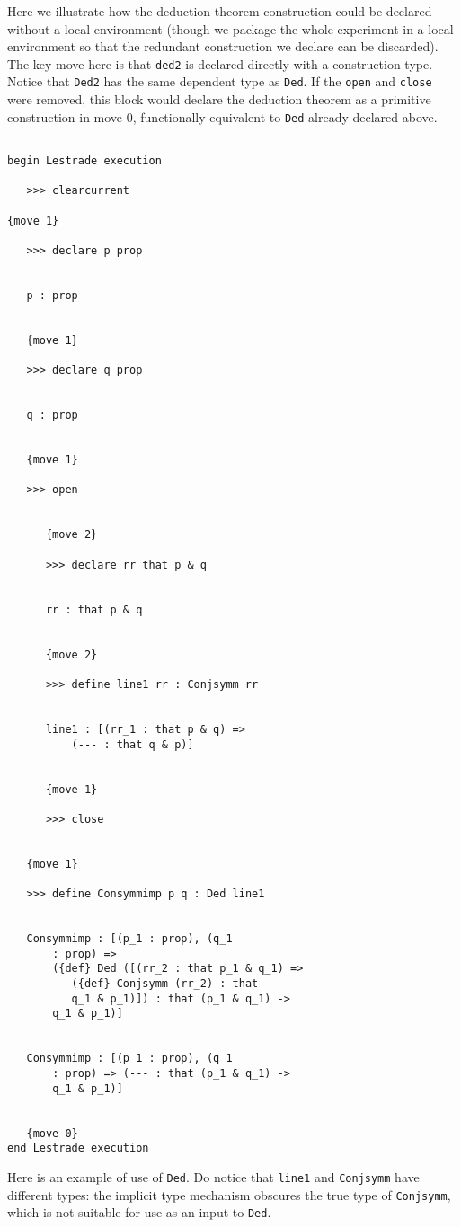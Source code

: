\documentclass[12pt]{article}
\begin{document}
Here we illustrate how the deduction theorem construction could be declared without a local environment (though we package the whole experiment in a local environment so that the redundant  construction we declare can be discarded).  The key move here is that {\tt ded2} is declared directly with a construction type.   Notice that {\tt Ded2} has the same dependent type as {\tt Ded}.  If the {\tt open} and {\tt close} were removed, this block would declare the deduction theorem as a primitive construction in move 0, functionally equivalent to {\tt Ded} already declared above.

\begin{verbatim}

begin Lestrade execution

   >>> clearcurrent

{move 1}

   >>> declare p prop


   p : prop


   {move 1}

   >>> declare q prop


   q : prop


   {move 1}

   >>> open


      {move 2}

      >>> declare rr that p & q


      rr : that p & q


      {move 2}

      >>> define line1 rr : Conjsymm rr


      line1 : [(rr_1 : that p & q) => 
          (--- : that q & p)]


      {move 1}

      >>> close


   {move 1}

   >>> define Consymmimp p q : Ded line1


   Consymmimp : [(p_1 : prop), (q_1 
       : prop) => 
       ({def} Ded ([(rr_2 : that p_1 & q_1) => 
          ({def} Conjsymm (rr_2) : that 
          q_1 & p_1)]) : that (p_1 & q_1) -> 
       q_1 & p_1)]


   Consymmimp : [(p_1 : prop), (q_1 
       : prop) => (--- : that (p_1 & q_1) -> 
       q_1 & p_1)]


   {move 0}
end Lestrade execution
\end{verbatim}

Here is an example of use of {\tt Ded}.  Do notice that {\tt line1} and {\tt Conjsymm} have different types:  the implicit type mechanism obscures the true type of {\tt Conjsymm}, which is not suitable for use as an input to {\tt Ded}.
\end{document}
